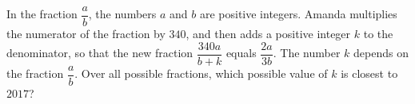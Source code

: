 In the fraction $\dfrac {a}{b}$, the numbers $a$ and $b$ are positive integers. Amanda multiplies the numerator of the fraction by $340$, and then adds a positive integer $k$ to the denominator, so that the new fraction $\dfrac{340a}{b+k}$ equals $\dfrac{2a}{3b}$. The number $k$ depends on the fraction $\dfrac {a}{b}$. Over all possible fractions, which possible value of $k$ is closest to $2017$?
